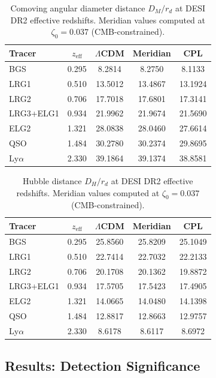 \begin{table}[htbp]
\centering
\caption{Comoving angular diameter distance $D_M/r_d$ at DESI DR2 effective redshifts. Meridian values computed at $\zeta_0 = 0.037$ (CMB-constrained).}
\label{tab:2-DM}
\begin{tabular}{lcccc}
\toprule
Tracer & $z_\mathrm{eff}$ & $\Lambda$CDM & Meridian & CPL \\
\midrule
BGS        & 0.295 &  8.2814 &  8.2750 &  8.1133 \\
LRG1       & 0.510 & 13.5012 & 13.4867 & 13.1924 \\
LRG2       & 0.706 & 17.7018 & 17.6801 & 17.3141 \\
LRG3+ELG1  & 0.934 & 21.9962 & 21.9674 & 21.5690 \\
ELG2       & 1.321 & 28.0838 & 28.0460 & 27.6614 \\
QSO        & 1.484 & 30.2780 & 30.2374 & 29.8695 \\
Ly$\alpha$ & 2.330 & 39.1864 & 39.1374 & 38.8581 \\
\bottomrule
\end{tabular}
\end{table}

\begin{table}[htbp]
\centering
\caption{Hubble distance $D_H/r_d$ at DESI DR2 effective redshifts. Meridian values computed at $\zeta_0 = 0.037$ (CMB-constrained).}
\label{tab:2-DH}
\begin{tabular}{lcccc}
\toprule
Tracer & $z_\mathrm{eff}$ & $\Lambda$CDM & Meridian & CPL \\
\midrule
BGS        & 0.295 & 25.8560 & 25.8209 & 25.1049 \\
LRG1       & 0.510 & 22.7414 & 22.7032 & 22.2133 \\
LRG2       & 0.706 & 20.1708 & 20.1362 & 19.8872 \\
LRG3+ELG1  & 0.934 & 17.5705 & 17.5423 & 17.4905 \\
ELG2       & 1.321 & 14.0665 & 14.0480 & 14.1398 \\
QSO        & 1.484 & 12.8817 & 12.8663 & 12.9757 \\
Ly$\alpha$ & 2.330 &  8.6178 &  8.6117 &  8.6972 \\
\bottomrule
\end{tabular}
\end{table}

\subsection{Results: Detection Significance}
\label{sec:2-DESI-sig}

